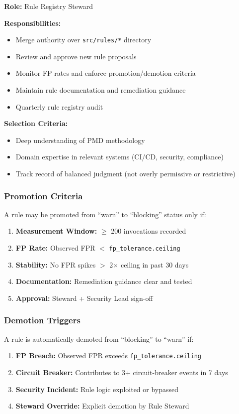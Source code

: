 \documentclass[11pt,a4paper]{article}
\begin{document}
\textbf{Role:} Rule Registry Steward

\textbf{Responsibilities:}
\begin{itemize}
\item Merge authority over \texttt{src/rules/*} directory
\item Review and approve new rule proposals
\item Monitor FP rates and enforce promotion/demotion criteria
\item Maintain rule documentation and remediation guidance
\item Quarterly rule registry audit
\end{itemize}

\textbf{Selection Criteria:}
\begin{itemize}
\item Deep understanding of PMD methodology
\item Domain expertise in relevant systems (CI/CD, security, compliance)
\item Track record of balanced judgment (not overly permissive or restrictive)
\end{itemize}

\subsubsection{Promotion Criteria}

A rule may be promoted from ``warn'' to ``blocking'' status only if:

\begin{enumerate}
\item \textbf{Measurement Window:} $\geq$ 200 invocations recorded
\item \textbf{FP Rate:} Observed FPR $<$ \texttt{fp\_tolerance.ceiling}
\item \textbf{Stability:} No FPR spikes $>$ 2$\times$ ceiling in past 30 days
\item \textbf{Documentation:} Remediation guidance clear and tested
\item \textbf{Approval:} Steward + Security Lead sign-off
\end{enumerate}

\subsubsection{Demotion Triggers}

A rule is automatically demoted from ``blocking'' to ``warn'' if:

\begin{enumerate}
\item \textbf{FP Breach:} Observed FPR exceeds \texttt{fp\_tolerance.ceiling}
\item \textbf{Circuit Breaker:} Contributes to 3+ circuit-breaker events in 7 days
\item \textbf{Security Incident:} Rule logic exploited or bypassed
\item \textbf{Steward Override:} Explicit demotion by Rule Steward
\end{enumerate}
\end{document}
